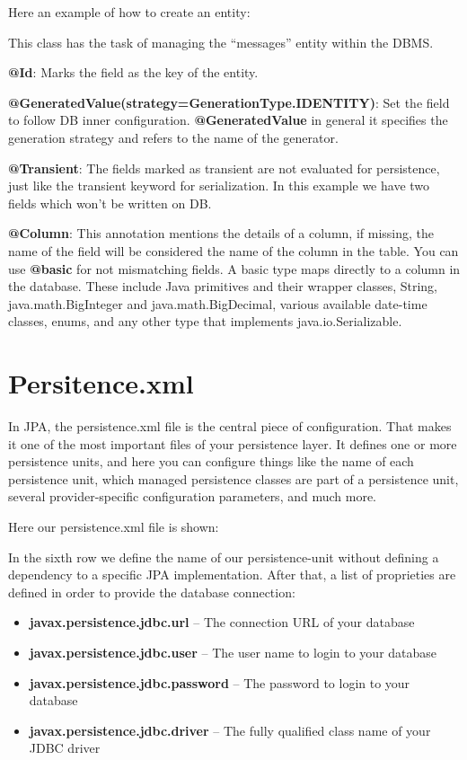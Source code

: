 \documentclass[a4paper]{article}
\begin{document}
Here an example of how to create an entity:


This class has the task of managing the “messages” entity within the DBMS.

\textbf{@Id}: Marks the field as the key of the entity.

\textbf{@GeneratedValue(strategy=GenerationType.IDENTITY)}: Set the field to follow DB inner configuration.
\textbf{@GeneratedValue} in general it specifies the generation strategy and refers to the name of the generator.

\textbf{@Transient}: The fields marked as transient are not evaluated for persistence, just like the transient
keyword for serialization. In this example we have two fields which won’t be  written on DB.

\textbf{@Column}: This annotation mentions the details of a column, if missing, the name of the field will be considered the name of the column in the table.
You can use \textbf{@basic} for not mismatching fields. A basic type maps directly to a column in the database. These include Java primitives and their wrapper classes, String, java.math.BigInteger and java.math.BigDecimal, various available date-time classes, enums, and any other type that implements java.io.Serializable.

\section{Persitence.xml}
In JPA, the persistence.xml file is the central piece of configuration. That makes it one of the most important files of your persistence layer. It defines one or more persistence units, and here you can configure things like the name of each persistence unit, which managed persistence classes are part of a persistence unit, several provider-specific configuration parameters, and much more.

Here our persistence.xml file is shown:


In the sixth row we define the name of our persistence-unit without defining a dependency to a specific JPA implementation. After that, a list of proprieties are defined in order to provide the database connection:

\begin{itemize}
\item\textbf{javax.persistence.jdbc.url} – The connection URL of your database
\item\textbf{javax.persistence.jdbc.user} – The user name to login to your database
\item\textbf{javax.persistence.jdbc.password} – The password to login to your database
\item\textbf{javax.persistence.jdbc.driver} – The fully qualified class name of your JDBC driver
\end{itemize}
\end{document}
